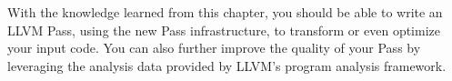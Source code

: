 With the knowledge learned from this chapter, you should be able to write an LLVM Pass, using the new Pass infrastructure, to transform or even optimize your input code. You can also further improve the quality of your Pass by leveraging the analysis data provided by LLVM's program analysis framework.











